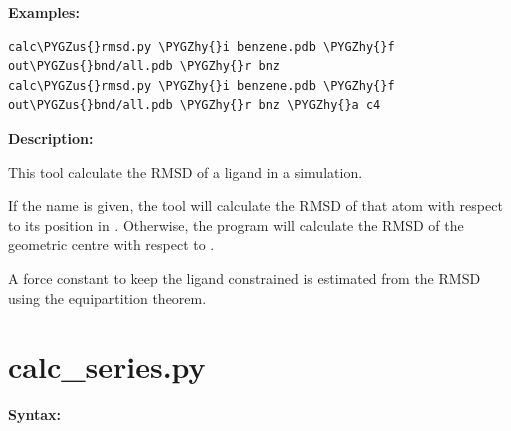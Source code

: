 \documentclass[letterpaper,10pt,english]{sphinxmanual}
\def\PYGZus{\char`\_}
\def\PYGZhy{\char`\-}
\begin{document}
\textbf{Examples:}

\begin{Verbatim}[commandchars=\\\{\}]
calc\PYGZus{}rmsd.py \PYGZhy{}i benzene.pdb \PYGZhy{}f out\PYGZus{}bnd/all.pdb \PYGZhy{}r bnz
calc\PYGZus{}rmsd.py \PYGZhy{}i benzene.pdb \PYGZhy{}f out\PYGZus{}bnd/all.pdb \PYGZhy{}r bnz \PYGZhy{}a c4
\end{Verbatim}

\textbf{Description:}

This tool calculate the RMSD of a ligand in a simulation.

If the  name is given, the tool will calculate the RMSD of that atom with respect to its position in . Otherwise, the program will calculate the RMSD of the geometric centre with respect to .

A force constant to keep the ligand constrained is estimated from the RMSD using the equipartition theorem.


\section{calc\_series.py}
\label{tools:calc-series-py}
\textbf{Syntax:}
\end{document}
